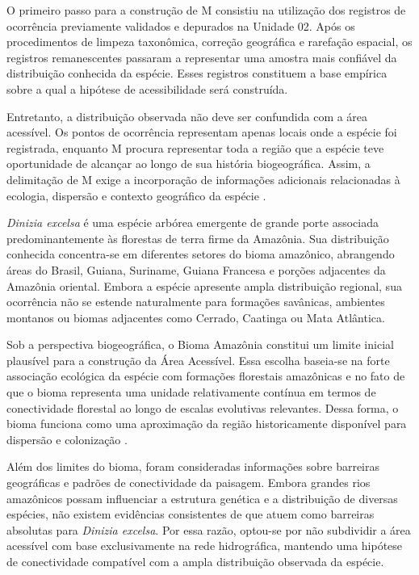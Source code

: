 O primeiro passo para a construção de M consistiu na utilização dos registros de ocorrência previamente validados e depurados na Unidade 02. Após os procedimentos de limpeza taxonômica, correção geográfica e rarefação espacial, os registros remanescentes passaram a representar uma amostra mais confiável da distribuição conhecida da espécie. Esses registros constituem a base empírica sobre a qual a hipótese de acessibilidade será construída.

Entretanto, a distribuição observada não deve ser confundida com a área acessível. Os pontos de ocorrência representam apenas locais onde a espécie foi registrada, enquanto M procura representar toda a região que a espécie teve oportunidade de alcançar ao longo de sua história biogeográfica. Assim, a delimitação de M exige a incorporação de informações adicionais relacionadas à ecologia, dispersão e contexto geográfico da espécie \parencite{Peterson2011,Guisan2017}.

\textit{Dinizia excelsa} é uma espécie arbórea emergente de grande porte associada predominantemente às florestas de terra firme da Amazônia. Sua distribuição conhecida concentra-se em diferentes setores do bioma amazônico, abrangendo áreas do Brasil, Guiana, Suriname, Guiana Francesa e porções adjacentes da Amazônia oriental. Embora a espécie apresente ampla distribuição regional, sua ocorrência não se estende naturalmente para formações savânicas, ambientes montanos ou biomas adjacentes como Cerrado, Caatinga ou Mata Atlântica.

Sob a perspectiva biogeográfica, o Bioma Amazônia constitui um limite inicial plausível para a construção da Área Acessível. Essa escolha baseia-se na forte associação ecológica da espécie com formações florestais amazônicas e no fato de que o bioma representa uma unidade relativamente contínua em termos de conectividade florestal ao longo de escalas evolutivas relevantes. Dessa forma, o bioma funciona como uma aproximação da região historicamente disponível para dispersão e colonização \parencite{Olson2001,Peterson2011}.

Além dos limites do bioma, foram consideradas informações sobre barreiras geográficas e padrões de conectividade da paisagem. Embora grandes rios amazônicos possam influenciar a estrutura genética e a distribuição de diversas espécies, não existem evidências consistentes de que atuem como barreiras absolutas para \textit{Dinizia excelsa}. Por essa razão, optou-se por não subdividir a área acessível com base exclusivamente na rede hidrográfica, mantendo uma hipótese de conectividade compatível com a ampla distribuição observada da espécie.

